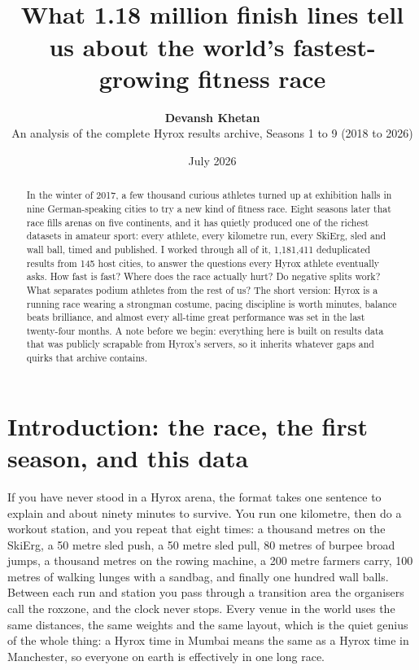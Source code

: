 \documentclass[11pt,a4paper]{article}
\title{\vspace{-1em}{\Huge\bfseries Hyrox: Every Race Ever Run}\\[0.6em]
{\Large What 1.18 million finish lines tell us about the world's fastest-growing fitness race}}
\author{{\large\bfseries Devansh Khetan}\\[0.3em]
{\color{dimtext} An analysis of the complete Hyrox results archive, Seasons 1 to 9 (2018 to 2026)}}
\date{\color{dimtext} July 2026}
\begin{document}
\maketitle
\thispagestyle{empty}

\begin{abstract}
\noindent
In the winter of 2017, a few thousand curious athletes turned up at exhibition
halls in nine German-speaking cities to try a new kind of fitness race. Eight
seasons later that race fills arenas on five continents, and it has quietly
produced one of the richest datasets in amateur sport: every athlete, every
kilometre run, every SkiErg, sled and wall ball, timed and published. I worked
through all of it, 1{,}181{,}411 deduplicated results from 145 host cities,
to answer the questions every Hyrox athlete eventually asks. How fast is fast?
Where does the race actually hurt? Do negative splits work? What separates
podium athletes from the rest of us? The short version: Hyrox is a running
race wearing a strongman costume, pacing discipline is worth minutes, balance
beats brilliance, and almost every all-time great performance was set in the
last twenty-four months. A note before we begin: everything here is built on
results data that was publicly scrapable from Hyrox's servers, so it inherits
whatever gaps and quirks that archive contains.
\end{abstract}

\vspace{1em}
\tableofcontents
\newpage
\listoffigures
\listoftables
\newpage

\section{Introduction: the race, the first season, and this data}

If you have never stood in a Hyrox arena, the format takes one sentence to
explain and about ninety minutes to survive. You run one kilometre, then do a
workout station, and you repeat that eight times: a thousand metres on the
SkiErg, a 50 metre sled push, a 50 metre sled pull, 80 metres of burpee broad
jumps, a thousand metres on the rowing machine, a 200 metre farmers carry,
100 metres of walking lunges with a sandbag, and finally one hundred wall
balls. Between each run and station you pass through a transition area the
organisers call the roxzone, and the clock never stops. Every venue in the
world uses the same distances, the same weights and the same layout, which is
the quiet genius of the whole thing: a Hyrox time in Mumbai means the same as
a Hyrox time in Manchester, so everyone on earth is effectively in one long
race.
\end{document}
